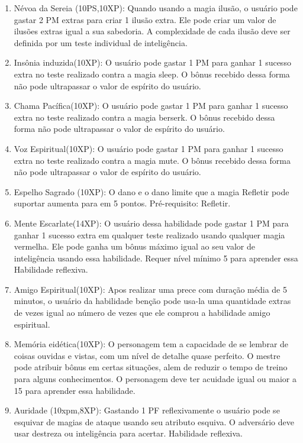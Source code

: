 \begin{enumerate}
		\item Névoa da Sereia (10PS,10XP): Quando usando a magia ilusão, o usuário pode gastar 2 PM extras para criar 1 ilusão extra. Ele pode criar um valor de ilusões extras igual a sua sabedoria. A complexidade de cada ilusão deve ser definida por um teste individual de inteligência.	
		
	\item Insônia induzida(10XP): O usuário pode gastar 1 PM para ganhar 1 sucesso extra no teste realizado contra a magia sleep. O bônus recebido dessa forma não pode ultrapassar o valor de espírito do usuário.
	
	\item Chama Pacífica(10XP): O usuário pode gastar 1 PM para ganhar 1 sucesso extra no teste realizado contra a magia berserk. O bônus recebido dessa forma não pode ultrapassar o valor de espírito do usuário.
		
	\item Voz Espiritual(10XP): O usuário pode gastar 1 PM para ganhar 1 sucesso extra no teste realizado contra a magia mute. O bônus recebido dessa forma não pode ultrapassar o valor de espírito do usuário.
	
	\item Espelho Sagrado (10XP): O dano e o dano limite que a magia Refletir pode suportar aumenta para em 5 pontos. Pré-requisito: Refletir.
	
	\item Mente Escarlate(14XP): O usuário dessa habilidade pode gastar 1 PM para ganhar 1 sucesso extra em qualquer teste realizado usando qualquer magia vermelha. Ele pode ganha um bônus máximo igual ao seu valor de inteligência usando essa habilidade. Requer nível mínimo 5 para aprender essa Habilidade reflexiva.

	\item Amigo Espiritual(10XP): Apos realizar uma prece com duração média de 5 minutos, o usuário da habilidade benção pode usa-la uma quantidade extras de vezes igual ao número de vezes que ele comprou a habilidade amigo espiritual. 

	\item Memória eidética(10XP): O personagem tem a capacidade de se lembrar de coisas ouvidas e vistas, com um nível de detalhe quase perfeito. O mestre pode atribuir bônus em certas situações, alem de reduzir o tempo de treino para alguns conhecimentos. O personagem deve ter acuidade igual ou maior a 15 para aprender essa habilidade.

		\item Auridade (10xpm,8XP): Gastando 1 PF reflexivamente o usuário pode se esquivar de magias de ataque usando seu atributo esquiva. O adversário deve usar destreza ou inteligência para acertar. Habilidade reflexiva. 


\end{enumerate}

